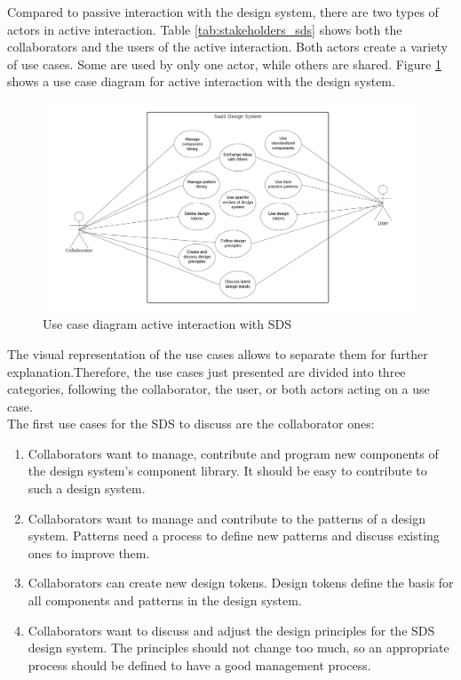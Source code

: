 Compared to passive interaction with the design system, there are two types of actors in active interaction. Table \ref{tab:stakeholders_sds} shows both the collaborators and the users of the active interaction. Both actors create a variety of use cases. Some are used by only one actor, while others are shared. Figure \ref{use_case_active} shows a use case diagram for active interaction with the design system. \\
\begin{figure}[htbp]
    \centerline{\includegraphics[width=\linewidth]{images/use_case_diagram_active.png}}
    \caption{Use case diagram active interaction with \ac{SDS}}
    \label{use_case_active}
\end{figure}
The visual representation of the use cases allows to separate them for further explanation.Therefore, the use cases just presented are divided into three categories, following the collaborator, the user, or both actors acting on a use case.\\

The first use cases for the \ac{SDS} to discuss are the collaborator ones:
\begin{enumerate}
    \item Collaborators want to manage, contribute and program new components of the design system's component library. It should be easy to contribute to such a design system.
    \item Collaborators want to manage and contribute to the patterns of a design system. Patterns need a process to define new patterns and discuss existing ones to improve them.
    \item Collaborators can create new design tokens. Design tokens define the basis for all components and patterns in the design system. 
    \item Collaborators want to discuss and adjust the design principles for the \ac{SDS} design system. The principles should not change too much, so an appropriate process should be defined to have a good management process.  
\end{enumerate}

